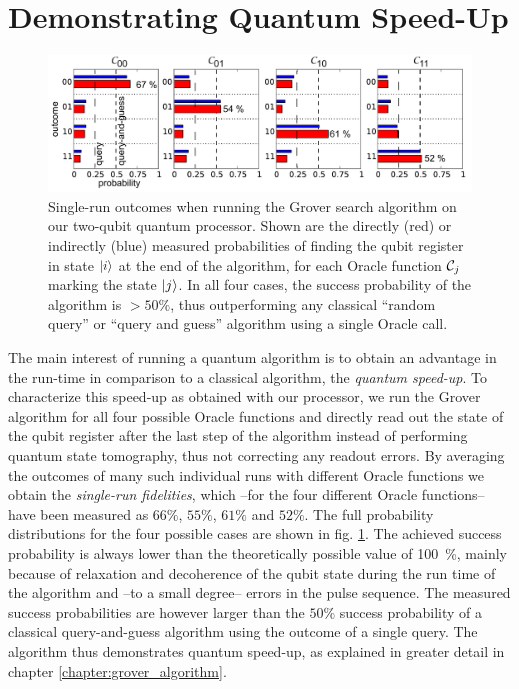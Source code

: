 \section{Demonstrating Quantum Speed-Up}

%
\begin{figure}[ht!]
 \centering \includegraphics[width=1\textwidth]{"./data/ct5/2011_04_21 - grover and tomo/good_data/grover algorithm - single run probabilities"}
\caption[Single-run results of the Grover search algorithm]{Single-run outcomes when running the Grover search algorithm on our two-qubit quantum processor. Shown are the directly (red) or indirectly (blue) measured probabilities of finding the qubit register in state $\left| i \right>$ at the end of the algorithm, for each Oracle function $\Or_j$ marking the state $\left| j \right>$. In all four cases, the success probability of the algorithm is $>50\%$, thus outperforming any classical ``random query'' or ``query and guess''
algorithm using a single Oracle call.}


\label{fig:grover_single_shot_probabilities} %
\end{figure}


The main interest of running a quantum algorithm is to obtain an advantage
in the run-time in comparison to a classical algorithm, the
\textit{quantum speed-up}. To characterize this speed-up as obtained
with our processor, we run the Grover algorithm for all four possible
Oracle functions and directly read out the state of the qubit register
after the last step of the algorithm instead of performing quantum
state tomography, thus not correcting any readout errors. By averaging
the outcomes of many such individual runs with different
Oracle functions we obtain the \textit{single-run fidelities},
which --for the four different Oracle functions-- have been measured
as $66\%$, $55\%$, $61\%$ and $52\%$. The full probability distributions
for the four possible cases are shown in fig.
\ref{fig:grover_single_shot_probabilities}. The achieved success
probability is always lower than the theoretically possible value
of \mbox{100 \%}, mainly because of relaxation and decoherence of the qubit
state during the run time of the algorithm and --to a small degree-- errors in the
pulse sequence. The measured success probabilities
are however larger than the $50\%$ success probability of a classical
query-and-guess algorithm using the outcome of a single query. The algorithm thus
demonstrates quantum speed-up, as
explained in greater detail in chapter \ref{chapter:grover_algorithm}. 

